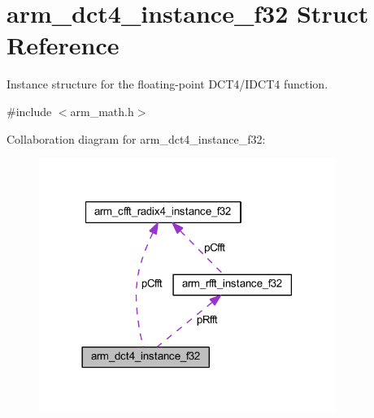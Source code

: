 \hypertarget{structarm__dct4__instance__f32}{}\section{arm\+\_\+dct4\+\_\+instance\+\_\+f32 Struct Reference}
\label{structarm__dct4__instance__f32}


Instance structure for the floating-\/point D\+C\+T4/\+I\+D\+C\+T4 function.  




{\ttfamily \#include $<$arm\+\_\+math.\+h$>$}



Collaboration diagram for arm\+\_\+dct4\+\_\+instance\+\_\+f32\+:
\nopagebreak
\begin{figure}[H]
\begin{center}
\leavevmode
\includegraphics[width=273pt]{structarm__dct4__instance__f32__coll__graph}
\end{center}
\end{figure}
